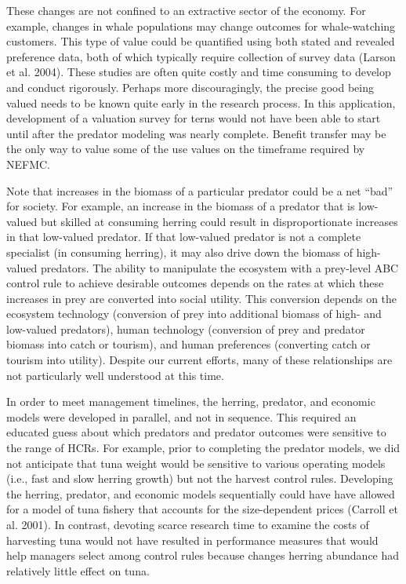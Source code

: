 \documentclass[]{article}
\begin{document}
These changes are not confined to an extractive sector of the economy.
For example, changes in whale populations may change outcomes for
whale-watching customers. This type of value could be quantified using
both stated and revealed preference data, both of which typically
require collection of survey data (Larson et al. 2004). These studies
are often quite costly and time consuming to develop and conduct
rigorously. Perhaps more discouragingly, the precise good being valued
needs to be known quite early in the research process. In this
application, development of a valuation survey for terns would not have
been able to start until after the predator modeling was nearly
complete. Benefit transfer may be the only way to value some of the use
values on the timeframe required by NEFMC.

Note that increases in the biomass of a particular predator could be a
net ``bad'' for society. For example, an increase in the biomass of a
predator that is low-valued but skilled at consuming herring could
result in disproportionate increases in that low-valued predator. If
that low-valued predator is not a complete specialist (in consuming
herring), it may also drive down the biomass of high-valued predators.
The ability to manipulate the ecosystem with a prey-level ABC control
rule to achieve desirable outcomes depends on the rates at which these
increases in prey are converted into social utility. This conversion
depends on the ecosystem technology (conversion of prey into additional
biomass of high- and low-valued predators), human technology (conversion
of prey and predator biomass into catch or tourism), and human
preferences (converting catch or tourism into utility). Despite our
current efforts, many of these relationships are not particularly well
understood at this time.

In order to meet management timelines, the herring, predator, and
economic models were developed in parallel, and not in sequence. This
required an educated guess about which predators and predator outcomes
were sensitive to the range of HCRs. For example, prior to completing
the predator models, we did not anticipate that tuna weight would be
sensitive to various operating models (i.e., fast and slow herring
growth) but not the harvest control rules. Developing the herring,
predator, and economic models sequentially could have have allowed for a
model of tuna fishery that accounts for the size-dependent prices
(Carroll et al. 2001). In contrast, devoting scarce research time to
examine the costs of harvesting tuna would not have resulted in
performance measures that would help managers select among control rules
because changes herring abundance had relatively little effect on tuna.
\end{document}

